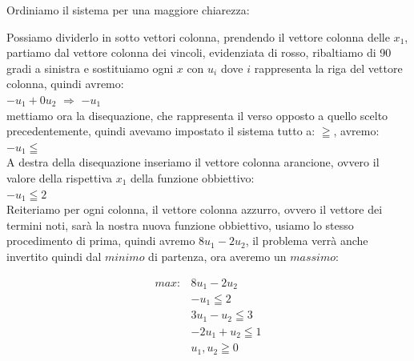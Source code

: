\documentclass{article}
\begin{document}
Ordiniamo il sistema per una maggiore chiarezza:\\

\begin{center}
\end{center}

Possiamo dividerlo in sotto vettori colonna, prendendo il vettore colonna delle $x_1$, partiamo dal vettore colonna dei vincoli, evidenziata di rosso, ribaltiamo di 90 gradi a sinistra e sostituiamo ogni $x$ con $u_i$ dove $i$ rappresenta la riga del vettore colonna, quindi avremo:\\
$-u_1 + 0u_2$ $\Rightarrow$ $-u_1$\\
mettiamo ora la disequazione, che rappresenta il verso opposto a quello scelto precedentemente, quindi avevamo impostato il sistema tutto a: $\geqq$, avremo:\\
$-u_1 \leqq$\\
A destra della disequazione inseriamo il vettore colonna arancione, ovvero il valore della rispettiva $x_1$ della funzione obbiettivo:\\
$-u_1 \leqq 2$\\
Reiteriamo per ogni colonna, il vettore colonna azzurro, ovvero il vettore dei termini noti, sarà la nostra nuova funzione obbiettivo, usiamo lo stesso procedimento di prima, quindi avremo $8u_1 - 2u_2$, il problema verrà anche invertito quindi dal $minimo$ di partenza, ora averemo un $massimo$:\\

\begin{center}
\begin{align*}
max: &8u_1 - 2u_2 \\
&-u_1 \leqq 2  \\
&3u_1 - u_2 \leqq 3  \\
&-2u_1 + u_2 \leqq 1   \\
&u_1, u_2 \geqq 0 \\
\end{align*}

\end{center}
\end{document}
